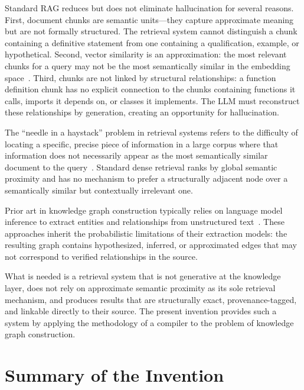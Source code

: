 \documentclass[12pt]{article}
\begin{document}
Standard RAG reduces but does not eliminate hallucination for several reasons.
First, document chunks are semantic units---they capture approximate meaning but
are not formally structured. The retrieval system cannot distinguish a chunk
containing a definitive statement from one containing a qualification, example,
or hypothetical. Second, vector similarity is an approximation: the most relevant
chunks for a query may not be the most semantically similar in the embedding
space~\cite{thakur2021beir}. Third, chunks are not linked by structural
relationships: a function definition chunk has no explicit connection to the
chunks containing functions it calls, imports it depends on, or classes it
implements. The LLM must reconstruct these relationships by generation, creating
an opportunity for hallucination.

The ``needle in a haystack'' problem in retrieval systems refers to the
difficulty of locating a specific, precise piece of information in a large corpus
where that information does not necessarily appear as the most semantically
similar document to the query~\cite{levy2024longcontext}. Standard dense
retrieval ranks by global semantic proximity and has no mechanism to prefer a
structurally adjacent node over a semantically similar but contextually
irrelevant one.

Prior art in knowledge graph construction typically relies on language model
inference to extract entities and relationships from unstructured
text~\cite{pan2024unifyingllmkg, edge2024graphrag, yao2023kgllm}. These
approaches inherit the probabilistic limitations of their extraction models: the
resulting graph contains hypothesized, inferred, or approximated edges that may
not correspond to verified relationships in the source.

What is needed is a retrieval system that is not generative at the knowledge
layer, does not rely on approximate semantic proximity as its sole retrieval
mechanism, and produces results that are structurally exact, provenance-tagged,
and linkable directly to their source. The present invention provides such a
system by applying the methodology of a compiler to the problem of knowledge
graph construction.

\section*{Summary of the Invention}
\end{document}
